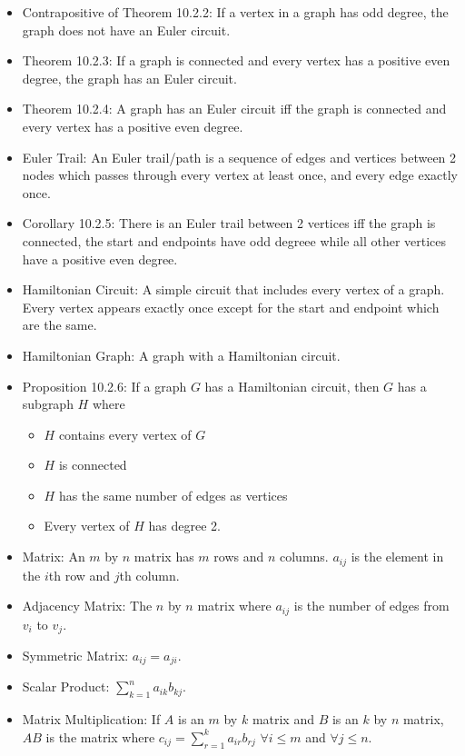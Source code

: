 \documentclass[10pt, portrait]{article}
\begin{document}
\begin{multicols*}{2}
\begin{itemize}
    \item Contrapositive of Theorem 10.2.2: If a vertex in a graph has odd degree, the graph does not have an Euler circuit.
    \item Theorem 10.2.3: If a graph is connected and every vertex has a positive even degree, the graph has an Euler circuit.
    \item Theorem 10.2.4: A graph has an Euler circuit iff the graph is connected and every vertex has a positive even degree.
    \item Euler Trail: An Euler trail/path is a sequence of edges and vertices between 2 nodes which passes through every vertex at least once, and every edge exactly once.
    \item Corollary 10.2.5: There is an Euler trail between 2 vertices iff the graph is connected, the start and endpoints have odd degreee while all other vertices have a positive even degree.
    \item Hamiltonian Circuit: A simple circuit that includes every vertex of a graph. Every vertex appears exactly once except for the start and endpoint which are the same.
    \item Hamiltonian Graph: A graph with a Hamiltonian circuit.
    \item Proposition 10.2.6: If a graph $G$ has a Hamiltonian circuit, then $G$ has a subgraph $H$ where
    \begin{itemize}
        \item $H$ contains every vertex of $G$
        \item $H$ is connected
        \item $H$ has the same number of edges as vertices
        \item Every vertex of $H$ has degree 2.
    \end{itemize}
    \item Matrix: An $m$ by $n$ matrix has $m$ rows and $n$ columns. $a_{ij}$ is the element in the $i$th row and $j$th column.
    \item Adjacency Matrix: The $n$ by $n$ matrix where $a_{ij}$ is the number of edges from $v_i$ to $v_j$.
    \item Symmetric Matrix: $a_{ij} = a_{ji}$.
    \item Scalar Product: $\sum_{k=1}^n a_{ik}b_{kj}$.
    \item Matrix Multiplication: If $A$ is an $m$ by $k$ matrix and $B$ is an $k$ by $n$ matrix, $AB$ is the matrix where $c_{ij}=\sum_{r=1}^k a_{ir}b_{rj}$ $\forall i \leq m$ and $\forall j \leq n$.

\end{itemize}
\end{multicols*}
\end{document}
